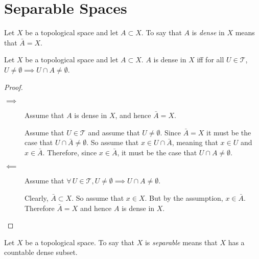 \documentclass[letterpaper,12pt,fleqn]{article}
\newcommand{\T}{\mathscr{T}}
\begin{document}
\section*{Separable Spaces}

\begin{definition}[Dense]
  Let \(X\) be a topological space and let \(A\subset X\).  To say that \(A\) is \emph{dense} in \(X\) means that
  \(\bar{A}=X\).
\end{definition}

\begin{theorem}
  Let \(X\) be a topological space and let \(A\subset X\).  \(A\) is dense in \(X\) iff for all \(U\in\T\),
  \(U\ne\emptyset\implies U\cap A\ne\emptyset\).
\end{theorem}

\begin{proof}
  \begin{description}
  \item[]
  \item[\(\implies\)] Assume that \(A\) is dense in \(X\), and hence \(\bar{A}=X\).

    Assume that \(U\in\T\) and assume that \(U\ne\emptyset\).  Since \(\bar{A}=X\) it must be the case that
    \(U\cap\bar{A}\ne\emptyset\).  So assume that \(x\in U\cap\bar{A}\), meaning that \(x\in U\) and
    \(x\in\bar{A}\).  Therefore, since \(x\in\bar{A}\), it must be the case that \(U\cap A\ne\emptyset\).

  \item[\(\impliedby\)] Assume that \(\forall\,U\in\T,U\ne\emptyset\implies U\cap A\ne\emptyset\).

    Clearly, \(\bar{A}\subset X\).  So assume that \(x\in X\).  But by the assumption, \(x\in\bar{A}\).
    Therefore \(\bar{A}=X\) and hence \(A\) is dense in \(X\).
  \end{description}
\end{proof}

\begin{definition}[Separable]
  Let \(X\) be a topological space.  To say that \(X\) is \emph{separable} means that \(X\) has a countable dense
  subset.
\end{definition}
\end{document}
